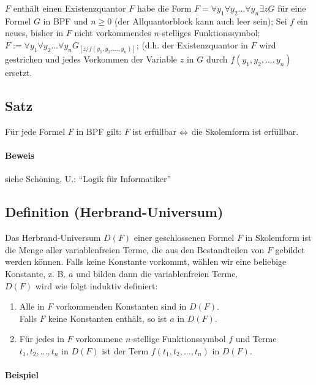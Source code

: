\documentclass[a4paper]{scrartcl}
\begin{document}
\begin{codebox}
\li \While $F$ enthält einen Existenzquantor
\li     \Do
            $F$ habe die Form $F=\forall y_1\forall y_2\ldots\forall y_n\exists zG$ für eine Formel $G$ in BPF
\zi         und $n\geq 0$ (der Allquantorblock kann auch leer sein);
\li         Sei $f$ ein neues, bisher in $F$ nicht vorkommendes $n$-stelliges
\zi         Funktionssymbol;
\li         $F:=\forall y_1\forall y_2\ldots\forall y_nG_{[z/f(y_1,y_2,\ldots ,y_n)]}$; (d.h. der Existenzquantor in $F$ wird
\zi         gestrichen und jedes Vorkommen der Variable $z$ in $G$ durch 
\zi         $f(y_1,y_2,\ldots ,y_n)$ ersetzt.
    \End
\end{codebox}

\subsection{Satz}

Für jede Formel $F$ in BPF gilt: $F$ ist erfüllbar $\Leftrightarrow$ die Skolemform ist erfüllbar.
\paragraph{Beweis} siehe Schöning, U.: "`Logik für Informatiker"'  

\subsection{Definition (Herbrand-Universum)}

Das Herbrand-Universum $D(F)$ einer geschlossenen Formel $F$ in Skolemform ist die Menge aller variablenfreien Terme, die aus den Bestandteilen von $F$ gebildet werden können. Falls keine Konstante vorkommt, wählen wir eine beliebige Konstante, z. B. $a$ und bilden dann die variablenfreien Terme.\\
$D(F)$ wird wie folgt induktiv definiert:
\begin{enumerate}
\item Alle in $F$ vorkommenden Konstanten sind in $D(F)$.\\
Falls $F$ keine Konstanten enthält, so ist $a$ in $D(F)$.
\item Für jedes in $F$ vorkommene $n$-stellige Funktionssymbol $f$ und Terme $t_1,t_2,\ldots ,t_n$ in $D(F)$ ist der Term $f(t_1,t_2,\ldots ,t_n)$ in $D(F)$.
\end{enumerate}

\paragraph{Beispiel}
\end{document}
